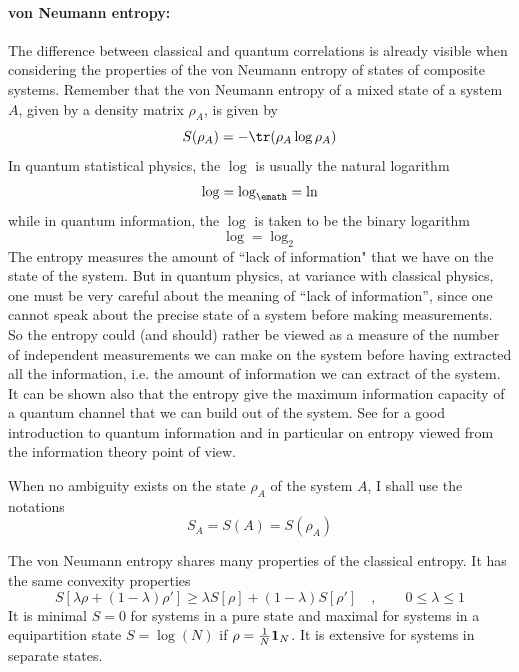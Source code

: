 \paragraph{von Neumann entropy:} The difference between classical and quantum correlations is already visible when considering the properties of the von Neumann entropy of states of composite systems.
Remember that the von Neumann entropy of a mixed state of a system $A$, given by a density matrix $\rho_A$, is given by
\begin{equation}
\label{ }
S(\rho_A)=-\tr(\rho_A\log\rho_A)
\end{equation}
In quantum statistical physics, the $\log$ is usually the natural logarithm
\begin{equation}
\label{ }
\log=\log_{\emath}=\ln
\end{equation}
while in quantum information, the $\log$ is taken to be the binary logarithm
\begin{equation}
\label{ }
\log=\log_{2}
\end{equation}
The entropy measures the amount of ``lack of information" that we have on the state of the system.  But in quantum physics, at variance with classical physics, one must be very careful about the meaning of ``lack of information'', since one cannot speak about the precise state of a system before making measurements. 
So the entropy could (and should) rather be viewed as a measure of the number of independent measurements we can make on the system before having extracted all the information, i.e. the amount of information we can extract of the system. It can be shown also that the entropy give the maximum information capacity of a quantum channel that we can build out of the system.
See \cite{Nielsen:2010fk} for a good introduction to quantum information and in particular on entropy viewed from the information theory point of view.

When no ambiguity exists on the state $\rho_A$ of the system $A$, I shall use the notations
\begin{equation}
\label{ }
S_A=S(A)=S(\rho_A)
\end{equation}

The von Neumann entropy shares many  properties of the classical entropy. It has the same  convexity properties
\begin{equation}
\label{ }
S[\lambda\rho+(1-\lambda)\rho']\ge \lambda S[\rho]+(1-\lambda)S[\rho']\quad,\qquad  0\le\lambda\le 1
\end{equation}
It is minimal $S=0$ for systems in a  pure state and maximal for systems in a equipartition state $S=\log(N)$ if $\rho={1\over N} \mathbf{1}_N$.
It is extensive for systems in separate states.

